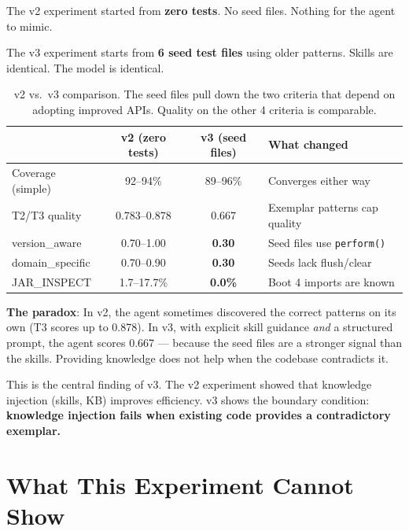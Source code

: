 \documentclass[11pt,a4paper]{article}
\begin{document}
The v2 experiment started from \textbf{zero tests}. No seed files.
Nothing for the agent to mimic.

The v3 experiment starts from \textbf{6 seed test files} using older patterns.
Skills are identical. The model is identical.

\begin{table}[H]
\centering
\renewcommand{\arraystretch}{1.3}
\begin{tabular}{@{}lccl@{}}
\toprule
& \textbf{v2 (zero tests)} & \textbf{v3 (seed files)} & \textbf{What changed} \\
\midrule
Coverage (simple)    & 92--94\% & 89--96\% & Converges either way \\
T2/T3 quality        & 0.783--0.878 & 0.667  & Exemplar patterns cap quality \\
version\_aware       & 0.70--1.00   & \textbf{0.30}   & Seed files use \texttt{perform()} \\
domain\_specific     & 0.70--0.90   & \textbf{0.30}   & Seeds lack flush/clear \\
JAR\_INSPECT         & 1.7--17.7\%  & \textbf{0.0\%}  & Boot 4 imports are known \\
\bottomrule
\end{tabular}
\caption{v2 vs.\ v3 comparison. The seed files pull down the two criteria that
  depend on adopting improved APIs. Quality on the other 4 criteria is comparable.}
\end{table}

\begin{warningbox}
\textbf{The paradox}: In v2, the agent sometimes discovered the correct patterns on its
own (T3 scores up to 0.878). In v3, with explicit skill guidance \emph{and} a structured
prompt, the agent scores 0.667 --- because the seed files are a stronger signal than
the skills. Providing knowledge does not help when the codebase contradicts it.
\end{warningbox}

This is the central finding of v3. The v2 experiment showed that knowledge injection
(skills, KB) improves efficiency. v3 shows the boundary condition:
\textbf{knowledge injection fails when existing code provides a contradictory exemplar.}

\section{What This Experiment Cannot Show}
\label{sec:limits}
\end{document}
